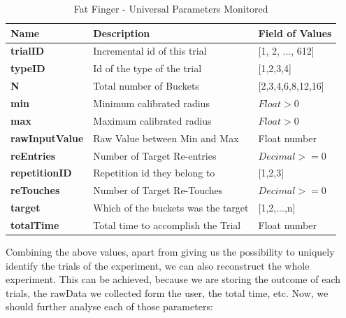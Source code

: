 \begin{table}[H]
\centering
\begin{tabular}{l || l || l}
Name & Description & Field of Values\\
\hline \hline
\textbf{trialID} & Incremental id of this trial & [1, 2, ..., 612] \\
\textbf{typeID} & Id of the type of the trial & [1,2,3,4] \\
\textbf{N} & Total number of Buckets & [2,3,4,6,8,12,16] \\
\textbf{min} & Minimum calibrated radius & $Float > 0$ \\
\textbf{max} & Maximum calibrated radius & $Float > 0$ \\
\textbf{rawInputValue} & Raw Value between Min and Max & Float number \\
\textbf{reEntries} & Number of Target Re-entries & $Decimal >= 0$ \\
\textbf{repetitionID} & Repetition id they belong to & [1,2,3] \\
\textbf{reTouches} & Number of Target Re-Touches & $Decimal >= 0$ \\
\textbf{target} & Which of the buckets was the target  & [1,2,...,n]\\
\textbf{totalTime} & Total time to accomplish the Trial & Float number
\end{tabular}
\caption{Fat Finger - Universal Parameters Monitored}
\label{tab:ffUniData}
\end{table}

Combining the above values, apart from giving us the possibility to uniquely identify the trials of the experiment, we can also reconstruct the whole experiment. This can be achieved, because we are storing the outcome of each trials, the rawData we collected form the user, the total time, etc. Now, we should further analyse each of those parameters:

